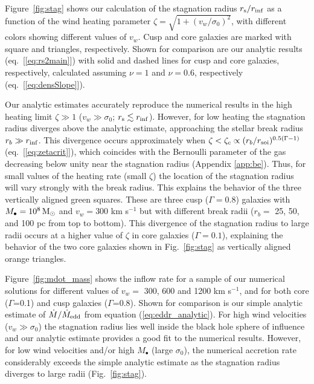\documentclass[usenatbib,fleqn]{mn2e}
\newcommand{\rb}{r_b}
\newcommand{\Mbh}[1][]{M_{\bullet#1}}
\newcommand{\vwO}{v_{w}}
\newcommand{\densSlope}{\nu}
\begin{document}
Figure~\ref{fig:stag} shows our calculation of the stagnation radius
$r_{\rm s}/r_{\rm inf}$ as a function of the wind heating parameter
$\zeta = \sqrt{1+(v_w/\sigma_0)^{2}}$, with different colors
showing different values of $v_{w}$.  Cusp and core galaxies are
marked with square and triangles, respectively.  Shown for comparison
are our analytic results (eq.~[\ref{eq:rs2main}]) with solid and
dashed lines for cusp and core galaxies, respectively, calculated
assuming $\densSlope = 1$ and $\densSlope= 0.6$, respectively
(eq.~[\ref{eq:densSlope}]).

Our analytic estimates accurately reproduce the numerical results in
the high heating limit $\zeta \gg 1$ ($v_w \gg \sigma_0$; $r_{\rm s}
\lesssim r_{\rm inf}$).  However, for low heating the stagnation
radius diverges above the analytic estimate, approaching the stellar
break radius $r_b \gg r_{\rm inf}$.  This divergence occurs
approximately when $\zeta < \zeta_c \propto (r_b/r_{\rm
  soi})^{0.5(\Gamma-1)}$ (eq.~[\ref{eq:zetacrit}]), which coincides
with the Bernoulli parameter of the gas decreasing below unity near
the stagnation radius (Appendix \ref{app:be}).  Thus, for small values
of the heating rate (small $\zeta$) the location of the stagnation
radius will vary strongly with the break radius. This explains the
behavior of the three vertically aligned green squares. These are
three cusp ($\Gamma=0.8$) galaxies with $\Mbh=10^8 \Msun$ and
$v_w=300$ km s$^{-1}$ but with different break radii ($\rb=$ 25, 50,
and 100 pc from top to bottom). This divergence of the stagnation
radius to large radii occurs at a higher value of $\zeta$ in core
galaxies ($\Gamma = 0.1$), explaining the behavior of the two core
galaxies shown in Fig.~\ref{fig:stag} as vertically aligned orange
triangles.


Figure~\ref{fig:mdot_mass} shows the inflow rate for a sample of
our numerical solutions for different values of
$\vwO =$ 300, 600 and 1200 km s$^{-1}$, and for both core
($\Gamma$=0.1) and cusp galaxies ($\Gamma$=0.8).  Shown for comparison
is our simple analytic estimate of $\dot{M}/\dot{M}_{\rm edd}$ from equation
(\ref{eq:eddr_analytic}).  For high wind velocities ($v_{w} \gg
\sigma_0$) the stagnation radius lies well inside the black hole sphere of
influence and our analytic estimate provides a good fit to the
numerical results.  However, for low wind velocities and/or high
$M_{\bullet}$ (large $\sigma_0$), the numerical accretion rate
considerably exceeds the simple analytic estimate as the stagnation radius
diverges to large radii (Fig.~\ref{fig:stag}).
\end{document}
